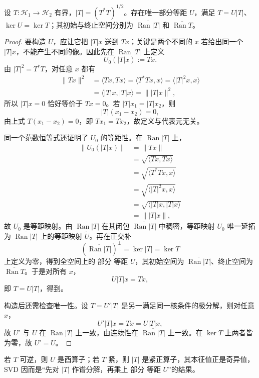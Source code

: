 \begin{theorem}[有界算子的唯一极分解]
设 $T:\mathcal H_1\to\mathcal H_2$ 有界，$|T|=(T^*T)^{1/2}$。存在唯一部分等距 $U$，满足 $T=U|T|$、$\ker U=\ker T$；其初始与终止空间分别为 $\overline{\operatorname{Ran}|T|}$ 和 $\overline{\operatorname{Ran}T}$。
\end{theorem}
\begin{proof}
要构造 $U$，应让它把 $|T|x$ 送到 $Tx$；关键是两个不同的 $x$ 若给出同一个 $|T|x$，不能产生不同的像。因此先在 $\operatorname{Ran}|T|$ 上定义
\[
U_0(|T|x):=Tx.
\]
由 $|T|^2=T^*T$，对任意 $x$ 都有
\begin{align*}
\|Tx\|^2
&=\langle Tx,Tx\rangle
=\langle T^*Tx,x\rangle
=\langle |T|^2x,x\rangle\\
&=\langle |T|x,|T|x\rangle
=\||T|x\|^2,
\end{align*}
所以 $|T|x=0$ 恰好等价于 $Tx=0$。若 $|T|x_1=|T|x_2$，则
\[
|T|(x_1-x_2)=0,
\]
由上式 $T(x_1-x_2)=0$，即 $Tx_1=Tx_2$，故定义与代表元无关。

同一个范数恒等式还证明了 $U_0$ 的等距性。在 $\operatorname{Ran}|T|$ 上，
\begin{align*}
\|U_0(|T|x)\|
&=\|Tx\|\\
&=\sqrt{\langle Tx,Tx\rangle}\\
&=\sqrt{\langle T^*Tx,x\rangle}\\
&=\sqrt{\langle |T|^2x,x\rangle}\\
&=\sqrt{\langle |T|x,|T|x\rangle}\\
&=\||T|x\|,
\end{align*}
故 $U_0$ 是等距映射。由 $\operatorname{Ran}|T|$ 在其闭包 $\overline{\operatorname{Ran}|T|}$ 中稠密，等距映射 $U_0$ 唯一延拓为 $\overline{\operatorname{Ran}|T|}$ 上的等距映射 $\widetilde U$。再在正交补
\[
(\overline{\operatorname{Ran}|T|})^\perp=\ker|T|=\ker T
\]
上定义为零，得到全空间上的 部分 等距 $U$，其初始空间为 $\overline{\operatorname{Ran}|T|}$、终止空间为 $\overline{\operatorname{Ran}T}$。于是对所有 $x$，
\[
U|T|x=Tx,
\]
即 $T=U|T|$，得到。

构造后还需检查唯一性。设 $T=U'|T|$ 是另一满足同一核条件的极分解，则对任意 $x$，
\[
U'|T|x=Tx=U|T|x,
\]
故 $U'$ 与 $U$ 在 $\operatorname{Ran}|T|$ 上一致，由连续性在 $\overline{\operatorname{Ran}|T|}$ 上一致。在 $\ker T$ 上两者皆为零，故 $U'=U$。
\end{proof}

若 $T$ 可逆，则 $U$ 是酉算子；若 $T$ 紧，则 $|T|$ 是紧正算子，其本征值正是奇异值，SVD 因而是“先对 $|T|$ 作谱分解，再乘上 部分 等距 $U$”的结果。

